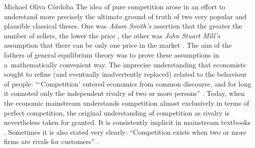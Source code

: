 \begin{artengenv}{Michael Oliva Córdoba}
The idea of pure competition arose in an effort to understand more precisely the ultimate ground of truth of two very popular and plausible classical theses. One was \textit{Adam Smith's} assertion that the greater the number of sellers, the lower the price 
\parencite[][pp.68–69]{smith_inquiry_1776}, %
 the other was \textit{John Stuart Mill's} assumption that there can be only one price in the market 
\parencite[][p.291]{mill_principles_1848}. %
 The aim of the fathers of general equilibrium theory was to prove these assumptions in a~mathematically convenient way. The imprecise understanding that economists sought to refine (and eventually inadvertently replaced) related to the behaviour of people: ``‘Competition' entered economics from common discourse, and for long it connoted only the independent rivalry of two or more persons'' 
\parencite[][p.1]{stigler_perfect_1957}. %
 Today, when the economic mainstream understands competition almost exclusively in terms of perfect competition, the original understanding of competition as rivalry is nevertheless taken for granted. It is consistently implicit in mainstream textbooks 
\parencites[cf.][p.357]{acemoglu_microeconomics_2016}[][p.281 et passim]{pindyck_microeconomics_2013}[][172f.]{samuelson_economics_2009}[p.241 et passim; among others][]{stiglitz_economics_2006}. %
 Sometimes it is also stated very clearly: ``Competition exists when two or more firms are rivals for customers'' 
\parencite[][p.42]{mankiw_economics_2014}.%





\end{artengenv}
